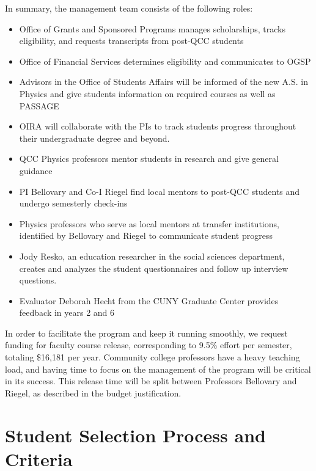 \documentclass[12pt]{article}
\begin{document}
In summary, the management team consists of the following roles:
\begin{itemize}
\setlength{\itemsep}{-\parsep}
\setlength{\topsep}{-\parsep}
\setlength{\partopsep}{-\parsep}
	\item Office of Grants and Sponsored Programs manages scholarships, tracks eligibility, and requests transcripts from post-QCC students
	\item Office of Financial Services determines eligibility and communicates to OGSP
		\item Advisors in the Office of Students Affairs will be informed of the new A.S. in Physics and give students information on required courses as well as PASSAGE
	\item OIRA will collaborate with the PIs to track students progress throughout their undergraduate degree and beyond.   
	\item QCC Physics professors mentor students in research and give general guidance
	\item PI Bellovary and Co-I Riegel find local mentors to post-QCC students and undergo semesterly check-ins
	\item Physics professors who serve as local mentors at transfer institutions, identified by Bellovary and Riegel to communicate student progress
	\item Jody Resko, an education researcher in the social sciences department,  creates and analyzes the student questionnaires and follow up interview questions.
	\item Evaluator Deborah Hecht from the CUNY Graduate Center provides feedback in years 2 and 6
\end{itemize}	

In order to facilitate the program and keep it running smoothly, we request funding for faculty course release, corresponding to 9.5\% effort per semester, totaling \$16,181 per year.  Community college professors have a heavy teaching load, and having time to focus on the management of the program will be critical in its success.  This release time will be split between Professors Bellovary and Riegel, as described in the budget justification.

\vspace{-5mm}

\section{\large{Student Selection Process and Criteria}}
\vspace{-3mm}
\end{document}
